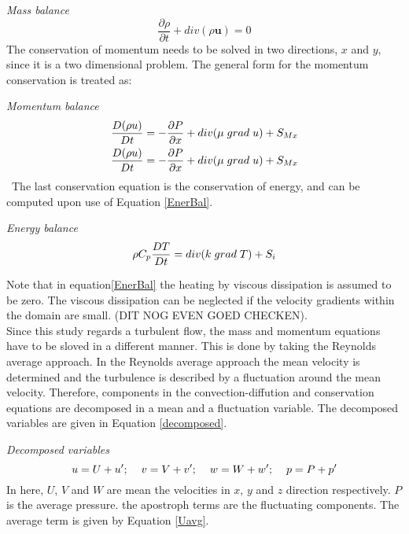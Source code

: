 \documentclass{CFD2017}
\begin{document}
\emph{Mass balance}
\begin{equation}
\label{MassBal}
\frac{\partial \rho }{\partial t} + div(\rho\mathbf u)= 0
\end{equation}
The conservation of momentum needs to be solved in two directions, $x$ and $y$, since it is a two dimensional problem. The general form for the momentum conservation is treated as:\vspace{2mm}

\emph{Momentum balance}
\begin{equation}
\begin{split}
\label{MomBal}
&\frac{D( \rho u) }{D t} =-\frac{\partial P}{\partial x} + div(\mu \hspace{1mm} grad\hspace{1mm}u)+S_{Mx}\\ 
&\frac{D( \rho u) }{D t} =-\frac{\partial P}{\partial x} + div(\mu \hspace{1mm} grad\hspace{1mm}u)+S_{Mx}
\end{split}
\end{equation}\
The last conservation equation is the conservation of energy, and can be computed upon use of Equation \ref{EnerBal}.\vspace{2mm}

\emph{Energy balance}
\begin{equation}
\label{EnerBal}
\rho C_p\frac{D T }{D t} = div(k \hspace{1mm}grad\hspace{1mm}T) +S_i 
\end{equation}

Note that in equation\ref{EnerBal} the heating by viscous dissipation is assumed to be zero. The viscous dissipation can be neglected if the velocity gradients within the domain are small. (DIT NOG EVEN GOED CHECKEN).\\
Since this study regards a turbulent flow, the mass and momentum equations have to be sloved in a different manner. This is done by taking the Reynolds average approach. In the Reynolds average approach the mean velocity is determined and the turbulence is described by a fluctuation around the mean velocity. Therefore, components in the convection-diffution and conservation equations are decomposed in a mean and a fluctuation variable. The decomposed variables are given in Equation \ref{decomposed}.\vspace{2mm}

\emph{Decomposed variables}
\begin{equation}
\label{decomposed}
u=U+u'; \hspace{4mm} v = V+v'; \hspace{4mm} w=W+w'; \hspace{4mm} p=P+p' 
\end{equation}
In here, $U$, $V$ and $W$ are mean the velocities in $x$, $y$ and $z$ direction respectively. $P$ is the average pressure. the apostroph terms are the fluctuating components. The average term is given by Equation \ref{Uavg}.\vspace{2mm}
\end{document}
